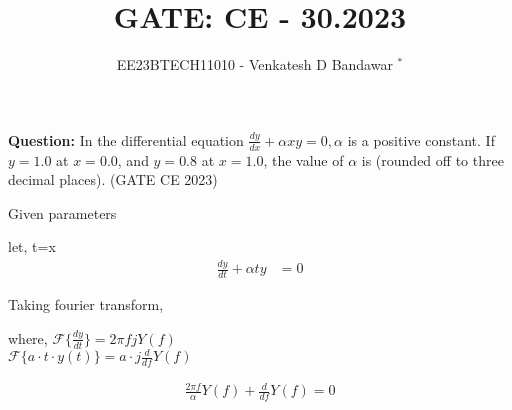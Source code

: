 \documentclass[journal,12pt,twocolumn]{IEEEtran}
\theoremstyle{remark}
\begin{document}

\vspace{3cm}

\title{GATE: CE - 30.2023}
\author{EE23BTECH11010 - Venkatesh D Bandawar $^{*}$%
}
\maketitle
\bigskip


\textbf{Question:} In the differential equation $\frac{dy}{dx} + \alpha x y = 0, \alpha$ is a positive constant. If $y = 1.0$ at
$x = 0.0$, and $y = 0.8$ at $x = 1.0$, the value of $\alpha$ is (rounded off to three decimal places).  \hfill(GATE CE 2023)

\solution
\begin{table}[!h] 
\centering

\caption{Given parameters}
\label{given parameters list.gate.ce.30}
\end{table}



let, t=x
\begin{align}
    \frac{dy}{dt} + \alpha t y &= 0
\end{align}

Taking fourier transform,

where,
$\mathcal{F}\{\frac{dy}{dt}\} = 2\pi fj Y(f) $ \\
$\mathcal{F}\{a \cdot t \cdot y(t)\} = a \cdot j \frac{d}{df} Y(f)$

\begin{align}
    \frac{2\pi f}{\alpha} Y(f) + \frac{d}{df} Y(f) = 0
\end{align}


\end{document}
